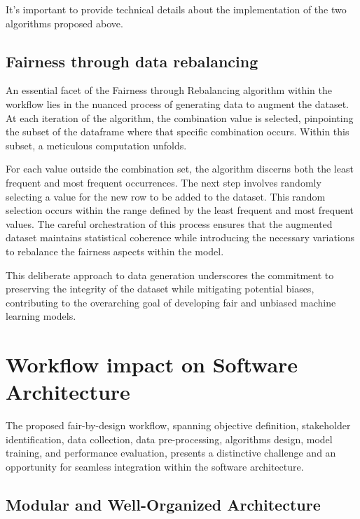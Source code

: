 \documentclass[12pt,a4paper,openright,twoside]{book}
\begin{document}
It's important to provide technical details about the implementation of the two algorithms proposed above.

\subsection{Fairness through data rebalancing}

An essential facet of the Fairness through Rebalancing algorithm within the workflow lies in the nuanced process of generating data to augment the dataset. At each iteration of the algorithm, the combination value is selected, pinpointing the subset of the dataframe where that specific combination occurs. Within this subset, a meticulous computation unfolds.



For each value outside the combination set, the algorithm discerns both the least frequent and most frequent occurrences. The next step involves randomly selecting a value for the new row to be added to the dataset. This random selection occurs within the range defined by the least frequent and most frequent values. The careful orchestration of this process ensures that the augmented dataset maintains statistical coherence while introducing the necessary variations to rebalance the fairness aspects within the model.

This deliberate approach to data generation underscores the commitment to preserving the integrity of the dataset while mitigating potential biases, contributing to the overarching goal of developing fair and unbiased machine learning models.

\section{Workflow impact on Software Architecture}

The proposed fair-by-design workflow, spanning objective definition, stakeholder identification, data collection, data pre-processing, algorithms design, model training, and performance evaluation, presents a distinctive challenge and an opportunity for seamless integration within the software architecture.

\subsection{Modular and Well-Organized Architecture}
\end{document}
